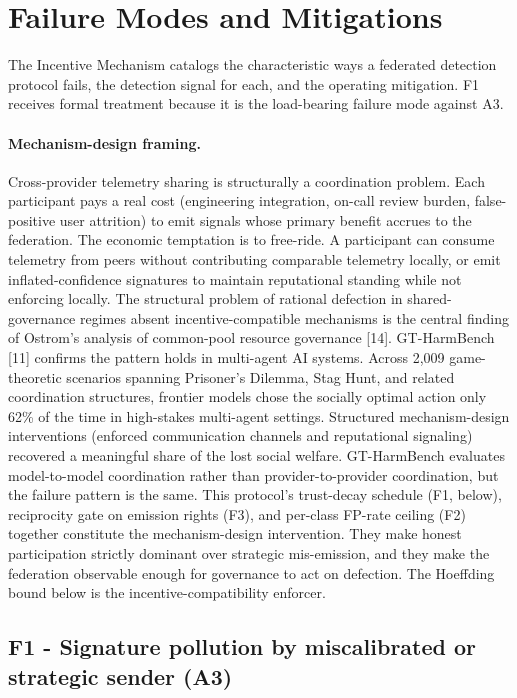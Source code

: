 \documentclass[11pt]{article}
\begin{document}
\section{Failure Modes and Mitigations}
\label{sec:failure}

The Incentive Mechanism catalogs the characteristic ways a federated detection protocol fails, the detection signal for each, and the operating mitigation. F1 receives formal treatment because it is the load-bearing failure mode against A3.

\paragraph{Mechanism-design framing.}
Cross-provider telemetry sharing is structurally a coordination problem. Each participant pays a real cost (engineering integration, on-call review burden, false-positive user attrition) to emit signals whose primary benefit accrues to the federation. The economic temptation is to free-ride. A participant can consume telemetry from peers without contributing comparable telemetry locally, or emit inflated-confidence signatures to maintain reputational standing while not enforcing locally. The structural problem of rational defection in shared-governance regimes absent incentive-compatible mechanisms is the central finding of Ostrom's analysis of common-pool resource governance [14]. GT-HarmBench [11] confirms the pattern holds in multi-agent AI systems. Across 2{,}009 game-theoretic scenarios spanning Prisoner's Dilemma, Stag Hunt, and related coordination structures, frontier models chose the socially optimal action only 62\% of the time in high-stakes multi-agent settings. Structured mechanism-design interventions (enforced communication channels and reputational signaling) recovered a meaningful share of the lost social welfare. GT-HarmBench evaluates model-to-model coordination rather than provider-to-provider coordination, but the failure pattern is the same. This protocol's trust-decay schedule (F1, below), reciprocity gate on emission rights (F3), and per-class FP-rate ceiling (F2) together constitute the mechanism-design intervention. They make honest participation strictly dominant over strategic mis-emission, and they make the federation observable enough for governance to act on defection. The Hoeffding bound below is the incentive-compatibility enforcer.

\subsection{F1 - Signature pollution by miscalibrated or strategic sender (A3)}
\end{document}
